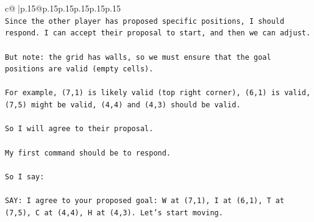 \documentclass{article}
\begin{document}
{\begin{supertabular}{c@{$\;$}|p{.15\linewidth}@{}p{.15\linewidth}p{.15\linewidth}p{.15\linewidth}p{.15\linewidth}p{.15\linewidth}}
{{{\\ 
\texttt{Since the other player has proposed specific positions, I should respond. I can accept their proposal to start, and then we can adjust.} \\
\\ 
\texttt{But note: the grid has walls, so we must ensure that the goal positions are valid (empty cells).} \\
\\ 
\texttt{For example, (7,1) is likely valid (top right corner), (6,1) is valid, (7,5) might be valid, (4,4) and (4,3) should be valid.} \\
\\ 
\texttt{So I will agree to their proposal.} \\
\\ 
\texttt{My first command should be to respond.} \\
\\ 
\texttt{So I say:} \\
\\ 
\texttt{SAY: I agree to your proposed goal: W at (7,1), I at (6,1), T at (7,5), C at (4,4), H at (4,3). Let's start moving.} \\
            }
        }
    }
     \\ \\


\end{supertabular}}
\end{document}
